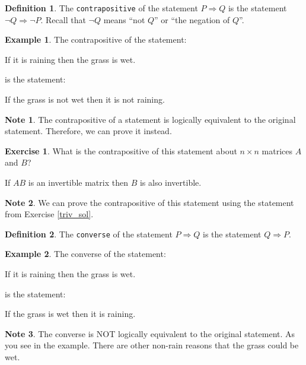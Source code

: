 \documentclass[handout]{beamer}
\newcommand{\fn}{\insertframenumber}
\theoremstyle{definition}
\newtheorem{exercise}{Exercise}
\newtheorem*{defn}{Definition}
\newtheorem*{exa}{Example}
\newtheorem*{nb}{Note}
\renewcommand{\emph}[1]{{\color{blue}\texttt{#1}}}
\begin{document}
\begin{frame}{\fn}
	\begin{defn}
		The \emph{contrapositive} of the statement $P\Rightarrow Q$ is the statement $\neg Q\Rightarrow \neg P$.  Recall that $\neg Q$ means ``not $Q$'' or ``the negation of $Q$''.
	\end{defn}
	\begin{exa}
		The contrapositive of the statement:
		\begin{center}
			If it is raining then the grass is wet.
		\end{center}
		is the statement:
		\begin{center}
			If the grass is not wet then it is not raining.
		\end{center}
	\end{exa}
	\begin{nb}
		The contrapositive of a statement is logically equivalent to the original statement.  Therefore, we can prove it instead.
	\end{nb}
\end{frame}
\begin{frame}{\fn}
	\begin{exercise}
		What is the contrapositive of this statement about $n\times n$ matrices $A$ and $B$?
			\begin{center}
				If $AB$ is an invertible matrix then $B$ is also invertible.
			\end{center}
	\end{exercise}
	\begin{nb}
		We can prove the contrapositive of this statement using the statement from Exercise \ref{triv_sol}.
	\end{nb}
\end{frame}
\begin{frame}{\fn}
	\begin{defn}
		The \emph{converse} of the statement $P\Rightarrow Q$ is the statement $Q\Rightarrow P$.
	\end{defn}
	\begin{exa}
		The converse of the statement:
		\begin{center}
			If it is raining then the grass is wet.
		\end{center}
		is the statement:
		\begin{center}
			If the grass is wet then it is raining.
		\end{center}
	\end{exa}
	\begin{nb}
		The converse is NOT logically equivalent to the original statement.  As you see in the example. There are other non-rain reasons that the grass could be wet.
	\end{nb}
\end{frame}
\end{document}
